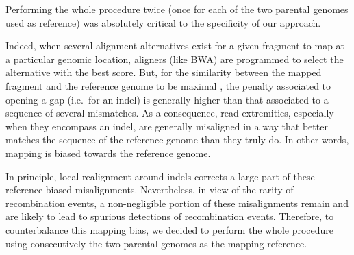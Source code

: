 Performing the whole procedure twice (once for each of the two parental genomes used as reference) was absolutely critical to the specificity of our approach.

Indeed, when several alignment alternatives exist for a given fragment to map at a particular genomic location, aligners (like BWA) are programmed to select the alternative with the best score.
But, for the similarity between the mapped fragment and the reference genome to be maximal \citep{smith1981identification}, the penalty associated to opening a gap (i.e.\ for an indel) is generally higher than that associated to a sequence of several mismatches.
As a consequence, read extremities, especially when they encompass an indel, are generally misaligned in a way that better matches the sequence of the reference genome than they truly do.
In other words, mapping is biased towards the reference genome.

In principle, local realignment around indels corrects a large part of these reference-biased misalignments.
Nevertheless, in view of the rarity of recombination events, a non-negligible portion of these misalignments remain and are likely to lead to spurious detections of recombination events.
Therefore, to counterbalance this mapping bias, we decided to perform the whole procedure using consecutively the two parental genomes as the mapping reference.\\

